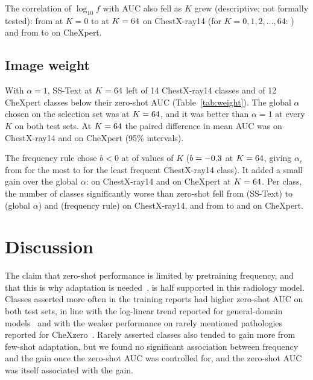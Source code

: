 \documentclass[journal]{IEEEtran}
\begin{document}
The correlation of $\log_{10} f$ with AUC also fell as $K$ grew (descriptive; not formally tested): from \NihTrendZero{} at $K=0$ to \NihTrendRef{} at $K=64$ on ChestX-ray14
(for $K=0,1,2,\ldots,64$: \NihTrendAll) and from \CxpTrendZero{} to \CxpTrendRef{} on CheXpert.

\subsection{Image weight}

With $\alpha=1$, SS-Text at $K=64$ left \NihFcaBelow{} of 14 ChestX-ray14 classes and \CxpFcaBelow{}
of 12 CheXpert classes below their zero-shot AUC (Table~\ref{tab:weight}). The global $\alpha$ chosen on
the selection set was \AlphaGlobalRef{} at $K=64$, and it was better than $\alpha=1$ at every $K$ on
both test sets. At $K=64$ the paired difference in mean AUC was \NihGlobalVsFca{} on ChestX-ray14 and
\CxpGlobalVsFca{} on CheXpert (95\% intervals).

The frequency rule chose $b<0$ at \RuleBNeg{} of \NK{} values of $K$ ($b=-0.3$ at $K=64$, giving
$\alpha_c$ from \AlphaRuleMin{} for the most to \AlphaRuleMax{} for the least frequent ChestX-ray14
class). It added a small gain over the global $\alpha$: \NihRuleVsGlobal{} on ChestX-ray14 and
\CxpRuleVsGlobal{} on CheXpert at $K=64$. Per class, the number of classes significantly worse than
zero-shot fell from \NihFcaSigWorse{} (SS-Text) to \NihGlobalSigWorse{} (global $\alpha$) and \NihRuleSigWorse{}
(frequency rule) on ChestX-ray14, and from \CxpFcaSigWorse{} to \CxpGlobalSigWorse{} and \CxpRuleSigWorse{} on CheXpert.

\section{Discussion}

The claim that zero-shot performance is limited by pretraining frequency, and that this is why
adaptation is needed~\cite{silvarodriguez2025fca}, is half supported in this radiology model. Classes
asserted more often in the training reports had higher zero-shot AUC on both test sets, in line with the
log-linear trend reported for general-domain models~\cite{udandarao2024zeroshot} and with the weaker
performance on rarely mentioned pathologies reported for CheXzero~\cite{mishra2023improving}. Rarely asserted classes
also tended to gain more from few-shot adaptation, but we found no significant association between
frequency and the gain once the zero-shot AUC was controlled for, and the zero-shot AUC was itself
associated with the gain.
\end{document}
